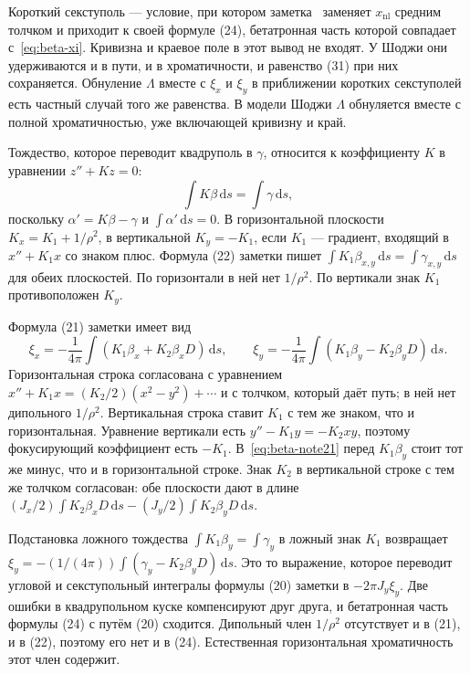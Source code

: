 Короткий секступоль --- условие, при котором заметка~\cite{SenichevNote} заменяет $x_{\mathrm{nl}}$ средним толчком и приходит к своей формуле (24), бетатронная часть которой совпадает с~\eqref{eq:beta-xi}. Кривизна и краевое поле в этот вывод не входят. У Шоджи они удерживаются и в пути, и в хроматичности, и равенство (31) при них сохраняется. Обнуление $\Lambda$ вместе с $\xi_x$ и $\xi_y$ в приближении коротких секступолей есть частный случай того же равенства. В модели Шоджи $\Lambda$ обнуляется вместе с полной хроматичностью, уже включающей кривизну и край.

Тождество, которое переводит квадруполь в $\gamma$, относится к коэффициенту $K$ в уравнении $z''+Kz=0$:
\begin{equation}
\label{eq:beta-twiss}
\int K\beta\,\mathrm{d}s=\int\gamma\,\mathrm{d}s,
\end{equation}
поскольку $\alpha'=K\beta-\gamma$ и $\int\alpha'\,\mathrm{d}s=0$. В горизонтальной плоскости $K_x=K_1+1/\rho^2$, в вертикальной $K_y=-K_1$, если $K_1$ --- градиент, входящий в $x''+K_1 x$ со знаком плюс. Формула (22) заметки пишет $\int K_1\beta_{x,y}\,\mathrm{d}s=\int\gamma_{x,y}\,\mathrm{d}s$ для обеих плоскостей. По горизонтали в ней нет $1/\rho^2$. По вертикали знак $K_1$ противоположен $K_y$.

Формула (21) заметки имеет вид
\begin{equation}
\label{eq:beta-note21}
\xi_x=-\frac{1}{4\pi}\int(K_1\beta_x+K_2\beta_x D)\,\mathrm{d}s,
\qquad
\xi_y=-\frac{1}{4\pi}\int(K_1\beta_y-K_2\beta_y D)\,\mathrm{d}s.
\end{equation}
Горизонтальная строка согласована с уравнением $x''+K_1 x=(K_2/2)(x^2-y^2)+\cdots$ и с толчком, который даёт путь; в ней нет дипольного $1/\rho^2$. Вертикальная строка ставит $K_1$ с тем же знаком, что и горизонтальная. Уравнение вертикали есть $y''-K_1 y=-K_2 xy$, поэтому фокусирующий коэффициент есть $-K_1$. В~\eqref{eq:beta-note21} перед $K_1\beta_y$ стоит тот же минус, что и в горизонтальной строке. Знак $K_2$ в вертикальной строке с тем же толчком согласован: обе плоскости дают в длине $(J_x/2)\int K_2\beta_x D\,\mathrm{d}s-(J_y/2)\int K_2\beta_y D\,\mathrm{d}s$.

Подстановка ложного тождества $\int K_1\beta_y=\int\gamma_y$ в ложный знак $K_1$ возвращает $\xi_y=-(1/(4\pi))\int(\gamma_y-K_2\beta_y D)\,\mathrm{d}s$. Это то выражение, которое переводит угловой и секступольный интегралы формулы (20) заметки в $-2\pi J_y\xi_y$. Две ошибки в квадрупольном куске компенсируют друг друга, и бетатронная часть формулы (24) с путём (20) сходится. Дипольный член $1/\rho^2$ отсутствует и в (21), и в (22), поэтому его нет и в (24). Естественная горизонтальная хроматичность этот член содержит.

